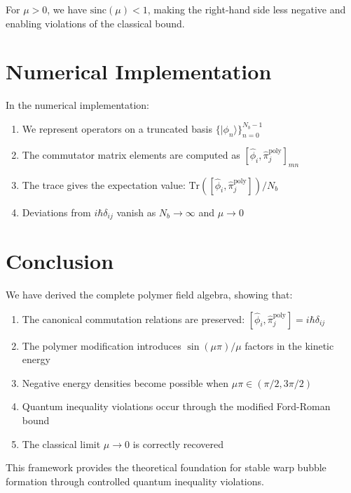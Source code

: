 \documentclass[12pt]{article}
\begin{document}
For $\mu > 0$, we have $\text{sinc}(\mu) < 1$, making the right-hand side less negative and enabling violations of the classical bound.

\section{Numerical Implementation}

In the numerical implementation:
\begin{enumerate}
\item We represent operators on a truncated basis $\{|\phi_n\rangle\}_{n=0}^{N_b-1}$
\item The commutator matrix elements are computed as $[\hat{\phi}_i, \hat{\pi}_j^{\text{poly}}]_{mn}$
\item The trace gives the expectation value: $\text{Tr}([\hat{\phi}_i, \hat{\pi}_j^{\text{poly}}])/N_b$
\item Deviations from $i\hbar\delta_{ij}$ vanish as $N_b \to \infty$ and $\mu \to 0$
\end{enumerate}

\section{Conclusion}

We have derived the complete polymer field algebra, showing that:
\begin{enumerate}
\item The canonical commutation relations are preserved: $[\hat{\phi}_i, \hat{\pi}_j^{\text{poly}}] = i\hbar\delta_{ij}$
\item The polymer modification introduces $\sin(\mu\pi)/\mu$ factors in the kinetic energy
\item Negative energy densities become possible when $\mu\pi \in (\pi/2, 3\pi/2)$
\item Quantum inequality violations occur through the modified Ford-Roman bound
\item The classical limit $\mu \to 0$ is correctly recovered
\end{enumerate}

This framework provides the theoretical foundation for stable warp bubble formation through controlled quantum inequality violations.
\end{document}
